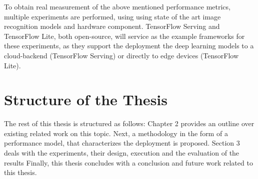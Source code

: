 To obtain real measurement of the above mentioned performance metrics, multiple experiments are performed, using  using state of the art image recognition models and hardware component.
TensorFlow Serving and TensorFlow Lite, both open-source, will service as the example frameworks for these experiments, as they support the deployment the deep learning models to a cloud-backend (TensorFlow Serving) or directly to edge devices (TensorFlow Lite).


\section{Structure of the Thesis}
The rest of this thesis is structured as follows: Chapter 2 provides an outline over existing related work on this topic. Next, a methodology in the form of a performance model, that characterizes the deployment is proposed.
Section 3 deals with the experiments, their design, execution and the evaluation of the results
Finally, this thesis concludes with a conclusion and future work related to this thesis.
\endinput 
